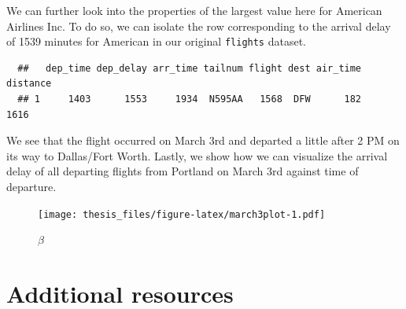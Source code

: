 \documentclass[12pt,twoside]{reedthesis}
\theoremstyle{definition}
\theoremstyle{definition}
\theoremstyle{remark}
\begin{document}
  We can further look into the properties of the largest value here for
  American Airlines Inc. To do so, we can isolate the row corresponding to
  the arrival delay of 1539 minutes for American in our original
  \texttt{flights} dataset.
  
  \begin{Shaded}
  \end{Shaded}
  
  \begin{verbatim}
  ##   dep_time dep_delay arr_time tailnum flight dest air_time distance
  ## 1     1403      1553     1934  N595AA   1568  DFW      182     1616
  \end{verbatim}
  
  We see that the flight occurred on March 3rd and departed a little after
  2 PM on its way to Dallas/Fort Worth. Lastly, we show how we can
  visualize the arrival delay of all departing flights from Portland on
  March 3rd against time of departure.
  
  \begin{Shaded}
  \end{Shaded}
  
  \begin{figure}[htbp]
  \centering
  \texttt{[image: thesis\_files/figure-latex/march3plot-1.pdf]}
  \caption{\label{fig:march3plot}\(\beta\)}
  \end{figure}
  
  \section{Additional resources}\label{additional-resources}
  
\end{document}
